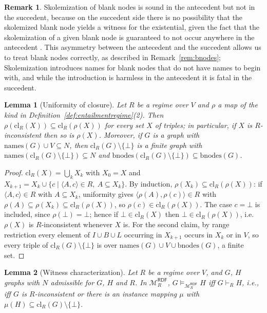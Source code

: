 \documentclass[12pt]{article}
\newtheorem{lemma}{Lemma}
\theoremstyle{definition}
\newtheorem{remark}{Remark}
\newcommand{\tuple}[1]{\langle #1 \rangle}
\newcommand{\Mcal}{\mathcal{M}}   %
\newcommand{\cl}{\mathrm{cl}}   %
\begin{document}
\begin{remark}
\label{rem:skolem}
Skolemization \citep[\S 3.5]{cyganiak2014rdf} of blank nodes is sound in the antecedent but not in the succedent, because on the succedent side there is no possibility that the skolemized blank node yields a witness for the existential, given the fact that the skolemization of a given blank node is guaranteed to not occur anywhere in the antecedent \citep{hogan2015skolemising}. This asymmetry between the antecedent and the succedent allows us to treat blank nodes correctly, as described in Remark~\ref{rem:bnodes}; Skolemization introduces names for blank nodes that do not have names to begin with, and while the introduction is harmless in the antecedent it is fatal in the succedent.
\end{remark}

\begin{lemma}[Uniformity of closure]
\label{lem:uniform}
Let $R$ be a regime over $V$ and $\rho$ a map of the kind in Definition~\ref{def:entailmentregime}(2). Then $\rho(\cl_R(X)) \subseteq \cl_R(\rho(X))$ for every set $X$ of triples; in particular, if $X$ is $R$-inconsistent then so is $\rho(X)$. Moreover, if $G$ is a graph with $\mathrm{names}(G) \cup V \subseteq N$, then $\cl_R(G) \setminus \{\bot\}$ is a finite graph with $\mathrm{names}(\cl_R(G) \setminus \{\bot\}) \subseteq N$ and $\mathrm{bnodes}(\cl_R(G) \setminus \{\bot\}) \subseteq \mathrm{bnodes}(G)$.
\end{lemma}

\begin{proof}
$\cl_R(X) = \bigcup_{k} X_k$ with $X_0 = X$ and $X_{k+1} = X_k \cup \{c \mid \tuple{A,c} \in R,\ A \subseteq X_k\}$. By induction, $\rho(X_k) \subseteq \cl_R(\rho(X))$: if $\tuple{A,c} \in R$ with $A \subseteq X_k$, uniformity gives $\tuple{\rho(A), \rho(c)} \in R$ with $\rho(A) \subseteq \rho(X_k) \subseteq \cl_R(\rho(X))$, so $\rho(c) \in \cl_R(\rho(X))$. 
The case $c=\bot$ is included, since $\rho(\bot)=\bot$; hence if $\bot \in \cl_R(X)$ then $\bot \in \cl_R(\rho(X))$, i.e.\ $\rho(X)$ is $R$-inconsistent whenever $X$ is.
For the second claim, by range restriction every element of $I \cup B \cup L$ occurring in $X_{k+1}$ occurs in $X_k$ or in $V$, so every triple of $\cl_R(G)\setminus \{\bot\}$ is over $\mathrm{names}(G) \cup V \cup \mathrm{bnodes}(G)$, a finite set.
\end{proof}

\begin{lemma}[Witness characterization]
\label{lem:witnesschar}
Let $R$ be a regime over $V$, and $G$, $H$ graphs with $N$ admissible for $G$, $H$ and $R$. In $\Mcal_{R}^{\mathsf{RDF}}$, $G \models_{\Mcal_{R}^{\mathsf{RDF}}} H$ iff $G \vdash_R H$, i.e., iff $G$ is $R$-inconsistent or there is an instance mapping $\mu$ with $\mu(H) \subseteq \cl_R(G) \setminus \{\bot\}$.
\end{lemma}
\end{document}
